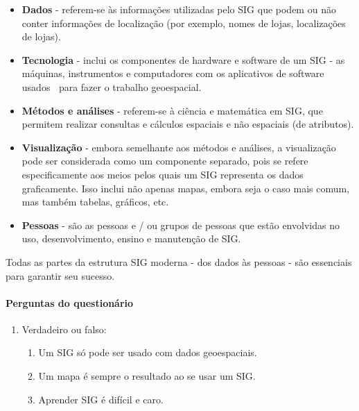 \documentclass[
]{book}
\providecommand{\tightlist}{%
  \setlength{\itemsep}{0pt}\setlength{\parskip}{0pt}}
\theoremstyle{definition}
\theoremstyle{definition}
\theoremstyle{definition}
\theoremstyle{definition}
\theoremstyle{remark}
\begin{document}
\begin{itemize}
\tightlist
\item
  \textbf{Dados} - referem-se às informações utilizadas pelo SIG que podem ou não conter informações de localização (por exemplo, nomes de lojas, localizações de lojas).
\item
  \textbf{Tecnologia} - inclui os componentes de hardware e software de um SIG - as máquinas, instrumentos e computadores com os aplicativos de software usados para fazer o trabalho geoespacial.
\item
  \textbf{Métodos e análises} - referem-se à ciência e matemática em SIG, que permitem realizar consultas e cálculos espaciais e não espaciais (de atributos).
\item
  \textbf{Visualização} - embora semelhante aos métodos e análises, a visualização pode ser considerada como um componente separado, pois se refere especificamente aos meios pelos quais um SIG representa os dados graficamente. Isso inclui não apenas mapas, embora seja o caso mais comum, mas também tabelas, gráficos, etc.
\item
  \textbf{Pessoas} - são as pessoas e / ou grupos de pessoas que estão envolvidas no uso, desenvolvimento, ensino e manutenção de SIG.
\end{itemize}

Todas as partes da estrutura SIG moderna - dos dados às pessoas - são essenciais para garantir seu sucesso.

\hypertarget{perguntas-do-questionuxe1rio}{%
\paragraph{Perguntas do questionário}\label{perguntas-do-questionuxe1rio}}

\begin{enumerate}
\def\labelenumi{\arabic{enumi}.}
\tightlist
\item
  Verdadeiro ou falso:

  \begin{enumerate}
  \def\labelenumii{\arabic{enumii}.}
  \tightlist
  \item
    Um SIG só pode ser usado com dados geoespaciais.
  \item
    Um mapa é sempre o resultado ao se usar um SIG.
  \item
    Aprender SIG é difícil e caro.
  \end{enumerate}
\end{enumerate}
\end{document}
